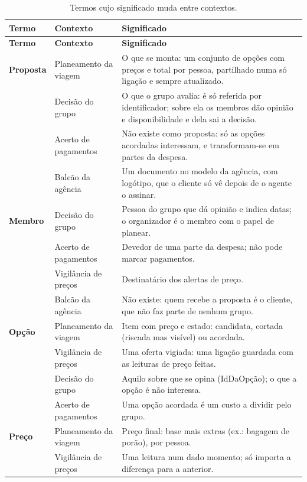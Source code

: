 \begin{longtable}{@{}p{3cm}p{3.6cm}p{8.7cm}@{}}
\caption{Termos cujo significado muda entre contextos.}\label{tab:termos}\\
\toprule \textbf{Termo} & \textbf{Contexto} & \textbf{Significado} \\ \midrule \endfirsthead
\toprule \textbf{Termo} & \textbf{Contexto} & \textbf{Significado} \\ \midrule \endhead
\textbf{Proposta} & Planeamento da viagem & O que se monta: um conjunto de opções com preços e total por pessoa, partilhado numa só ligação e sempre atualizado. \\
 & Decisão do grupo & O que o grupo avalia: é só referida por identificador; sobre ela os membros dão opinião e disponibilidade e dela sai a decisão. \\
 & Acerto de pagamentos & Não existe como proposta: só as opções acordadas interessam, e transformam-se em partes da despesa. \\
 & Balcão da agência & Um documento no modelo da agência, com logótipo, que o cliente só vê depois de o agente o assinar. \\
\midrule
\textbf{Membro} & Decisão do grupo & Pessoa do grupo que dá opinião e indica datas; o organizador é o membro com o papel de planear. \\
 & Acerto de pagamentos & Devedor de uma parte da despesa; não pode marcar pagamentos. \\
 & Vigilância de preços & Destinatário dos alertas de preço. \\
 & Balcão da agência & Não existe: quem recebe a proposta é o cliente, que não faz parte de nenhum grupo. \\
\midrule
\textbf{Opção} & Planeamento da viagem & Item com preço e estado: candidata, cortada (riscada mas visível) ou acordada. \\
 & Vigilância de preços & Uma oferta vigiada: uma ligação guardada com as leituras de preço feitas. \\
 & Decisão do grupo & Aquilo sobre que se opina (IdDaOpção); o que a opção é não interessa. \\
 & Acerto de pagamentos & Uma opção acordada é um custo a dividir pelo grupo. \\
\midrule
\textbf{Preço} & Planeamento da viagem & Preço final: base mais extras (ex.: bagagem de porão), por pessoa. \\
 & Vigilância de preços & Uma leitura num dado momento; só importa a diferença para a anterior. \\

\end{longtable}
